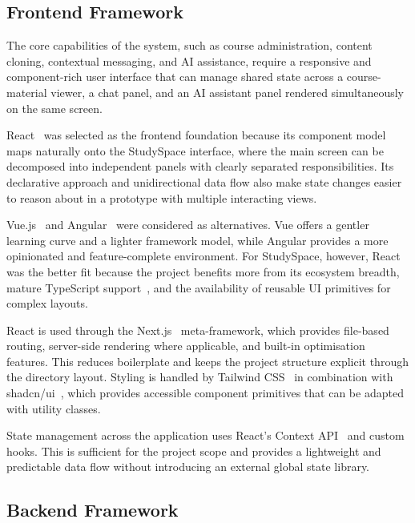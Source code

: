 \subsection{Frontend Framework}
\label{subsec:frontend-tech}

The core capabilities of the system, such as course administration, content cloning, contextual messaging, and AI assistance, require a responsive and component-rich user interface that can manage shared state across a course-material viewer, a chat panel, and an AI assistant panel rendered simultaneously on the same screen.

React~\cite{React} was selected as the frontend foundation because its component model maps naturally onto the StudySpace interface, where the main screen can be decomposed into independent panels with clearly separated responsibilities. Its declarative approach and unidirectional data flow also make state changes easier to reason about in a prototype with multiple interacting views.

Vue.js~\cite{Vuejs} and Angular~\cite{Angular} were considered as alternatives. Vue offers a gentler learning curve and a lighter framework model, while Angular provides a more opinionated and feature-complete environment. For StudySpace, however, React was the better fit because the project benefits more from its ecosystem breadth, mature TypeScript support~\cite{TypeScript}, and the availability of reusable UI primitives for complex layouts.

React is used through the Next.js~\cite{Nextjs} meta-framework, which provides file-based routing, server-side rendering where applicable, and built-in optimisation features. This reduces boilerplate and keeps the project structure explicit through the directory layout. Styling is handled by Tailwind CSS~\cite{TailwindCSS} in combination with shadcn/ui~\cite{ShadcnUI}, which provides accessible component primitives that can be adapted with utility classes.

State management across the application uses React's Context API~\cite{ReactContextAPI} and custom hooks. This is sufficient for the project scope and provides a lightweight and predictable data flow without introducing an external global state library.

\subsection{Backend Framework}
\label{subsec:backend-tech}

